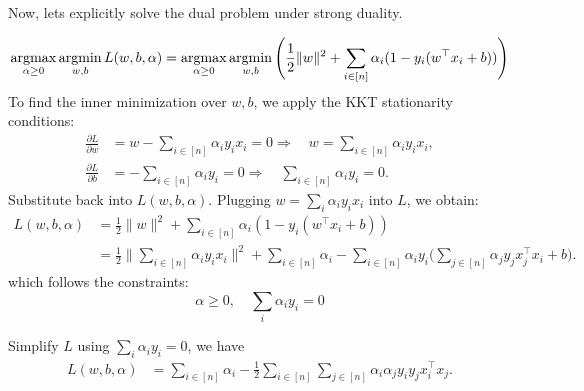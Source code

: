\documentclass[../main]{subfiles}
\begin{document}
Now, lets explicitly solve the dual problem under strong duality.
\begin{solution}
\begin{equation}
    \mathop{\mathrm{argmax}}_{\alpha \ge 0} \mathop{\mathrm{argmin}}_{w,b} L(w,b,\alpha)
    = \mathop{\mathrm{argmax}}_{\alpha \ge 0} \mathop{\mathrm{argmin}}_{w,b} 
      \Bigg( \frac{1}{2}\|w\|^2 + \sum_{i \in [n]} \alpha_i (1 - y_i (w^\top x_i + b)) \Bigg)
\end{equation}
To find the inner minimization over $w,b$, we apply the KKT stationarity conditions:
\begin{align}
    \frac{\partial L}{\partial w} &= w - \sum_{i \in [n]} \alpha_i y_i x_i = 0
    \Rightarrow\quad w = \sum_{i \in [n]} \alpha_i y_i x_i, \\
    \frac{\partial L}{\partial b} &= -\sum_{i \in [n]} \alpha_i y_i = 0
    \Rightarrow\quad \sum_{i \in [n]} \alpha_i y_i = 0.
\end{align}
{Substitute back into $L(w,b,\alpha)$.}
Plugging $w = \sum_i \alpha_i y_i x_i$ into $L$, we obtain:
\begin{align}
    L(w,b,\alpha)
    &= \frac{1}{2}\|w\|^2 + \sum_{i \in [n]} \alpha_i (1 - y_i(w^\top x_i + b)) \\
    &= \frac{1}{2}
        \Bigg\|
            \sum_{i \in [n]} \alpha_i y_i x_i
        \Bigg\|^2
        + \sum_{i \in [n]} \alpha_i
        - \sum_{i \in [n]} \alpha_i y_i 
            \Bigg(\sum_{j \in [n]} \alpha_j y_j x_j^\top x_i + b\Bigg).
\end{align}
which follows the constraints:
\begin{equation}
    \alpha\ge 0,\quad \sum_{i}\alpha_i y_i=0
\end{equation}

Simplify $L$ using $\sum_i \alpha_i y_i = 0$, we have
\begin{align}
    L(w,b,\alpha)
    &= \sum_{i \in [n]} \alpha_i
       - \frac{1}{2}
         \sum_{i \in [n]} \sum_{j \in [n]}
         \alpha_i \alpha_j y_i y_j x_i^\top x_j.
         \label{equ:3.50}
\end{align}


\end{solution}
\end{document}
